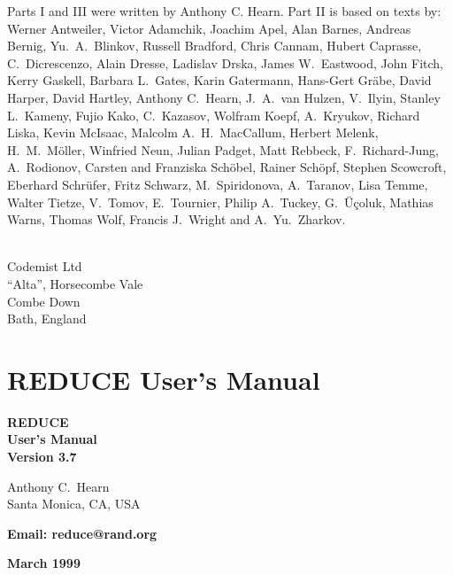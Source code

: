\documentclass[11pt,letterpaper]{book}
\newcommand{\REDUCE}{REDUCE}
\begin{document}
Parts I and III were written by Anthony C. Hearn.  Part II is based on
texts by:\\
Werner Antweiler,
Victor Adamchik,
Joachim Apel,
Alan Barnes,
Andreas Bernig,
Yu.~A.~Blinkov,
Russell Bradford,
Chris Cannam,
Hubert Caprasse,
C.~{Dicrescenzo},
Alain Dresse,
Ladislav Drska,
James W.~Eastwood,
John Fitch,
Kerry Gaskell,
Barbara L.~Gates,
Karin Gatermann,
Hans-Gert Gr\"abe,
David Harper,
David {H}artley,
Anthony C.~Hearn,
J.~A.~van Hulzen,
V.~Ilyin,
Stanley L.~Kameny,
Fujio Kako,
C.~Kazasov,
Wolfram Koepf,
A.~Kryukov,
Richard Liska,
Kevin McIsaac,
Malcolm A.~H.~MacCallum,
Herbert Melenk,
H.~M.~M\"oller,
Winfried Neun,
Julian Padget,
Matt Rebbeck,
F.~Richard-Jung,
A.~Rodionov,
Carsten and Franziska Sch\"obel,
{Rainer} Sch\"opf,
Stephen Scowcroft,
Eberhard Schr\"{u}fer,
Fritz Schwarz,
M.~Spiridonova,
A.~Taranov,
Lisa Temme,
Walter Tietze,
V.~Tomov,
E.~Tournier,
Philip A.~Tuckey,
G.~\"{U}\c{c}oluk,
Mathias Warns,
Thomas Wolf,
Francis J.~Wright
and
A.~Yu.~Zharkov.

\noindent
{} \\
Codemist Ltd \\
``Alta'', Horsecombe Vale \\
Combe Down \\
Bath, England
\newpage
\tableofcontents
\part{{\REDUCE} User's Manual}

\vspace*{2.0in}
\begin{center}

{\Huge\bf {\REDUCE}} \\ [0.2cm]
{\LARGE\bf User's Manual\vspace{0.4cm} \\
  Version 3.7}

\vspace{0.5in}\large\bf

Anthony C.\ Hearn \\
Santa Monica, CA, USA

\vspace{0.1in}

\bf Email: reduce@rand.org

\vspace{0.5in}

\large\bf March 1999

\end{center}
\end{document}
